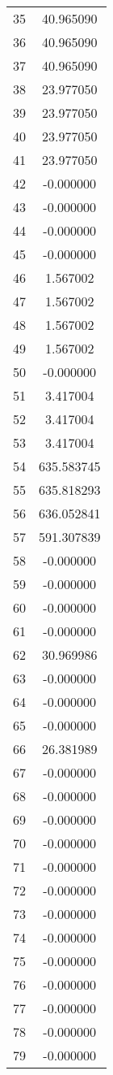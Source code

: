 \documentclass[12pt]{article}
\begin{document}
\begin{longtable}{@{}cc@{}}
35 & 40.965090 \\
36 & 40.965090 \\
37 & 40.965090 \\
38 & 23.977050 \\
39 & 23.977050 \\
40 & 23.977050 \\
41 & 23.977050 \\
42 & -0.000000 \\
43 & -0.000000 \\
44 & -0.000000 \\
45 & -0.000000 \\
46 & 1.567002 \\
47 & 1.567002 \\
48 & 1.567002 \\
49 & 1.567002 \\
50 & -0.000000 \\
51 & 3.417004 \\
52 & 3.417004 \\
53 & 3.417004 \\
54 & 635.583745 \\
55 & 635.818293 \\
56 & 636.052841 \\
57 & 591.307839 \\
58 & -0.000000 \\
59 & -0.000000 \\
60 & -0.000000 \\
61 & -0.000000 \\
62 & 30.969986 \\
63 & -0.000000 \\
64 & -0.000000 \\
65 & -0.000000 \\
66 & 26.381989 \\
67 & -0.000000 \\
68 & -0.000000 \\
69 & -0.000000 \\
70 & -0.000000 \\
71 & -0.000000 \\
72 & -0.000000 \\
73 & -0.000000 \\
74 & -0.000000 \\
75 & -0.000000 \\
76 & -0.000000 \\
77 & -0.000000 \\
78 & -0.000000 \\
79 & -0.000000 \\

\end{longtable}
\end{document}
